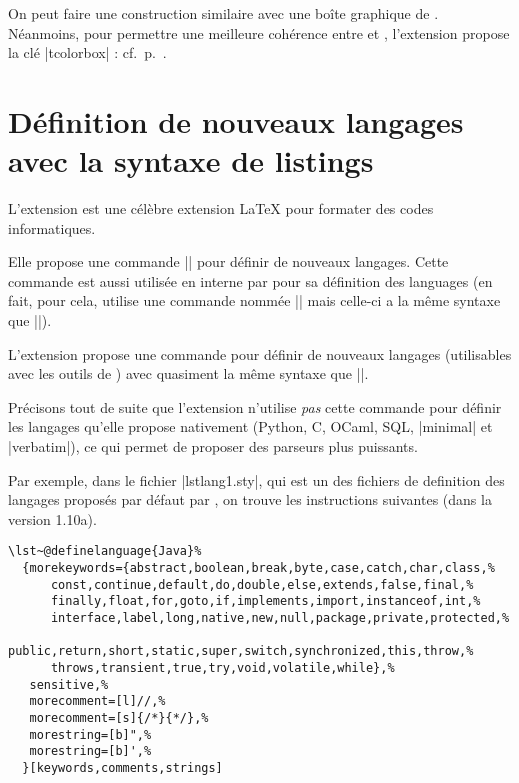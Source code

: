 \documentclass[dvipsnames,svgnames]{article}
\begin{document}
\bigskip
On peut faire une construction similaire avec une boîte graphique de .
Néanmoins, pour permettre une meilleure cohérence entre  et ,
l'extension  propose la clé |tcolorbox| : cf.~p.~\pageref{tcolorbox}.

\section{Définition de nouveaux langages avec la syntaxe de listings}

\label{NewPitonLanguage}

\medskip
L'extension  est une célèbre extension LaTeX pour formater des codes informatiques.   

\medskip
Elle propose une commande |\lstdefinelanguage| pour définir de nouveaux langages. Cette
commande est aussi utilisée en interne par  pour sa définition des languages
(en fait, pour cela,  utilise une commande nommée |\lst@definelanguage| mais
celle-ci a la même syntaxe que |\lstdefinelanguage|).

\medskip
L'extension  propose une commande  pour
définir de nouveaux langages (utilisables avec les outils de ) avec quasiment
la même syntaxe que |\lstdefinelanguage|.

\medskip
Précisons tout de suite que l'extension  n'utilise \emph{pas} cette commande
pour définir les langages qu'elle propose nativement (Python, C, OCaml, SQL, |minimal| et
|verbatim|), ce qui permet de proposer des parseurs plus puissants. 

\medskip
Par exemple, dans le fichier |lstlang1.sty|, qui est un des fichiers de definition des
langages proposés par défaut par , on trouve les instructions suivantes
(dans la version 1.10a).

\begin{Verbatim}[formatcom=\small\color{gray}]
\lst~@definelanguage{Java}%
  {morekeywords={abstract,boolean,break,byte,case,catch,char,class,%
      const,continue,default,do,double,else,extends,false,final,%
      finally,float,for,goto,if,implements,import,instanceof,int,%
      interface,label,long,native,new,null,package,private,protected,%
      public,return,short,static,super,switch,synchronized,this,throw,%
      throws,transient,true,try,void,volatile,while},%
   sensitive,%
   morecomment=[l]//,%
   morecomment=[s]{/*}{*/},%
   morestring=[b]",%
   morestring=[b]',%
  }[keywords,comments,strings]
\end{Verbatim}
\end{document}
